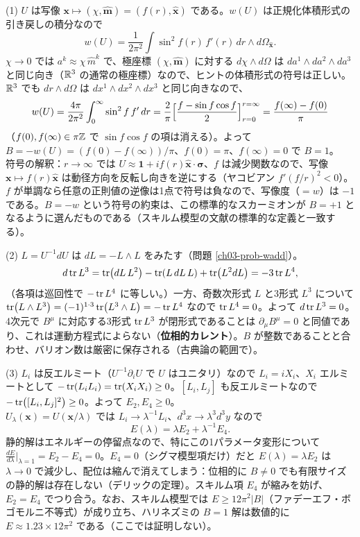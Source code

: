 \begin{solution}
(1) $U$ は写像 $\bm x\mapsto(\chi,\hat{\bm m})=(f(r),\hat{\bm x})$ である。$w(U)$ は正規化体積形式の引き戻しの積分なので
\[
w(U)=\frac{1}{2\pi^2}\int\sin^2f(r)\,f'(r)\,dr\wedge d\Omega_{\hat{\bm x}} .
\]
$\chi\to0$ では $a^k\approx\chi\,\hat m^k$ で、極座標 $(\chi,\hat{\bm m})$ に対する $d\chi\wedge d\Omega$ は $da^1\wedge da^2\wedge da^3$ と同じ向き（$\mathbb{R}^3$ の通常の極座標）なので、ヒントの体積形式の符号は正しい。$\mathbb{R}^3$ でも $dr\wedge d\Omega$ は $dx^1\wedge dx^2\wedge dx^3$ と同じ向きなので、
\[
w(U)=\frac{4\pi}{2\pi^2}\int_0^\infty\sin^2f\,f'\,dr=\frac2\pi\Bigl[\frac{f-\sin f\cos f}{2}\Bigr]_{r=0}^{r=\infty}=\frac{f(\infty)-f(0)}{\pi}
\]
（$f(0),f(\infty)\in\pi\mathbb{Z}$ で $\sin f\cos f$ の項は消える）。よって $B=-w(U)=(f(0)-f(\infty))/\pi$、$f(0)=\pi$、$f(\infty)=0$ で $B=1$。\\
符号の解釈：$r\to\infty$ では $U\approx\mathbf 1+if(r)\hat{\bm x}\cdot\bm\sigma$、$f$ は減少関数なので、写像 $\bm x\mapsto f(r)\hat{\bm x}$ は動径方向を反転し向きを逆にする（ヤコビアン $f'(f/r)^2<0$）。$f$ が単調なら任意の正則値の逆像は1点で符号は負なので、写像度（$=w$）は $-1$ である。$B=-w$ という符号の約束は、この標準的なスカーミオンが $B=+1$ となるように選んだものである（スキルム模型の文献の標準的な定義と一致する）。

(2) $L=U^{-1}dU$ は $dL=-L\wedge L$ をみたす（問題 \ref{ch03-prob-wadd}）。
\[
d\tr L^3=\tr(dL\,L^2)-\tr(L\,dL\,L)+\tr(L^2dL)=-3\tr L^4 ,
\]
（各項は巡回性で $-\tr L^4$ に等しい。）一方、奇数次形式 $L$ と3形式 $L^3$ について $\tr(L\wedge L^3)=(-1)^{1\cdot3}\tr(L^3\wedge L)=-\tr L^4$ なので $\tr L^4=0$。よって $d\tr L^3=0$。4次元で $B^\mu$ に対応する3形式 $\tr L^3$ が閉形式であることは $\partial_\mu B^\mu=0$ と同値であり、これは運動方程式によらない（\textbf{位相的カレント}）。$B$ が整数であることと合わせ、バリオン数は厳密に保存される（古典論の範囲で）。

(3) $L_i$ は反エルミート（$U^{-1}\partial_iU$ で $U$ はユニタリ）なので $L_i=iX_i$、$X_i$ エルミートとして $-\tr(L_iL_i)=\tr(X_iX_i)\ge0$。$[L_i,L_j]$ も反エルミートなので $-\tr([L_i,L_j]^2)\ge0$。よって $E_2,E_4\ge0$。\\
$U_\lambda(\bm x)=U(\bm x/\lambda)$ では $L_i\to\lambda^{-1}L_i$、$d^3x\to\lambda^3d^3y$ なので
\[
E(\lambda)=\lambda E_2+\lambda^{-1}E_4 .
\]
静的解はエネルギーの停留点なので、特にこの1パラメータ変形について $\frac{dE}{d\lambda}\big|_{\lambda=1}=E_2-E_4=0$。$E_4=0$（シグマ模型項だけ）だと $E(\lambda)=\lambda E_2$ は $\lambda\to0$ で減少し、配位は縮んで消えてしまう：位相的に $B\neq0$ でも有限サイズの静的解は存在しない（デリックの定理）。スキルム項 $E_4$ が縮みを妨げ、$E_2=E_4$ でつり合う。なお、スキルム模型では $E\ge12\pi^2\lvert B\rvert$（ファデーエフ・ボゴモルニ不等式）が成り立ち、ハリネズミの $B=1$ 解は数値的に $E\approx1.23\times12\pi^2$ である（ここでは証明しない）。
\end{solution}

